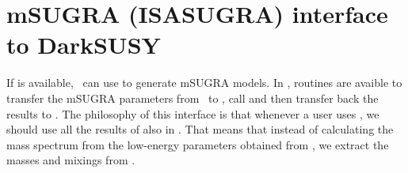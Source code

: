 
\section{mSUGRA (ISASUGRA) interface to DarkSUSY}

If  is available, \ds\ can use  to
generate mSUGRA models. In , routines are avaible to
transfer the mSUGRA parameters from \ds\ to , call
 and then transfer back the results to \ds. The
philosophy of this interface is that whenever a user uses
, we should use all the results of  also
in \ds. That means that instead of calculating the mass spectrum from
the low-energy parameters obtained from , we extract
the masses and mixings from .
